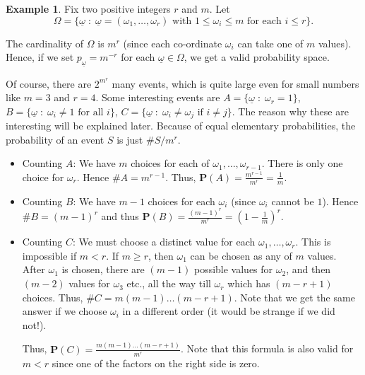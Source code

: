 \documentclass[preprint,  11pt]{amsart}
\def\ome{\omega}
\theoremstyle{plain} %
\theoremstyle{definition} %
\newtheorem{example}[theorem]{Example}
\begin{document}
\begin{example}\label{eg:rballsinmbins} Fix two positive integers $r$ and $m$. Let 
$$\Omega=\{\underline{\ome}{\; : \;} \underline{\ome}=(\omega_{1},\ldots ,\omega_{r}) \mbox{ with }1\le \omega_{i} \le m \mbox{ for each }i\le r\}.$$

The cardinality of $\Omega$ is $m^{r}$ (since each co-ordinate $\omega_{i}$ can take one of $m$ values). Hence, if we set $p_{\underline{\ome}}=m^{-r}$ for each $\underline{\ome}\in \Omega$, we get a valid probability space. 

Of course, there are $2^{m^{r}}$ many events, which is quite large even for small numbers like $m=3$ and $r=4$. Some interesting events are $A=\{\underline{\ome} {\; : \;} \omega_{r}=1\}$, $B=\{\underline{\ome}{\; : \;} \omega_{i}\not=1 \mbox{ for all }i\}$, $C=\{\underline{\ome}{\; : \;} \omega_{i}\not=\omega_{j} \mbox{ if } i\not= j\}$. The reason why these are interesting will be explained later. Because of equal elementary probabilities, the probability of an event $S$ is just $\#S/m^{r}$.
\begin{itemize}\setlength\itemsep{3pt}
\item Counting $A$: We have $m$ choices for each of  $\omega_{1},\ldots ,\omega_{r-1}$. There is only one choice for $\omega_{r}$. Hence $\#A=m^{r-1}$. Thus, $\mathbf{P}(A)=\frac{m^{r-1}}{m^{r}} = \frac{1}{m}$.
\item Counting $B$: We have $m-1$ choices for each $\omega_{i}$ (since $\omega_{i}$ cannot be $1$). Hence $\#B=(m-1)^{r}$ and thus $\mathbf{P}(B)=\frac{(m-1)^{r}}{m^{r}}=(1-\frac{1}{m})^{r}$.
\item Counting $C$: We must choose a distinct value for each $\omega_{1},\ldots ,\omega_{r}$. This is impossible if $m<r$. If $m\ge r$, then $\omega_{1}$ can be chosen as any of $m$ values. After $\omega_{1}$ is chosen, there are $(m-1)$ possible values for $\omega_{2}$, and then $(m-2)$ values for $\omega_{3}$ etc., all the way till $\omega_{r}$ which has $(m-r+1)$ choices. Thus, $\#C=m(m-1)\ldots (m-r+1)$. Note that we get the same answer if we choose $\omega_{i}$ in a different order (it would be strange if we did not!).

Thus, $\mathbf{P}(C)=\frac{m(m-1)\ldots (m-r+1)}{m^{r}}$. Note that this formula is also valid for $m<r$ since one of the factors on the right side is zero.
\end{itemize}

\end{example}
\end{document}
